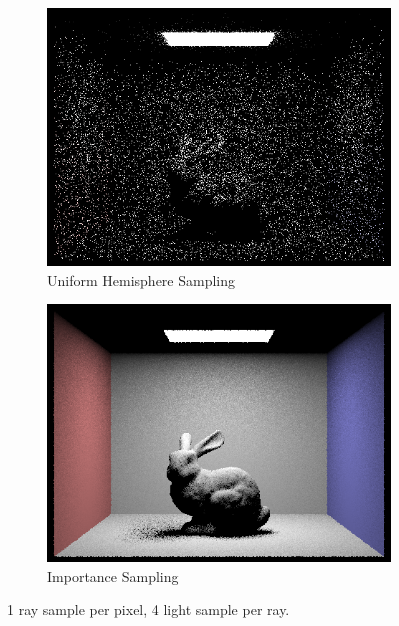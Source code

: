 \documentclass{article}
\begin{document}
\begin{figure}
\begin{subfigure}[h]{0.4\textwidth}
\includegraphics[width=\textwidth]{task3/CBbunny_1_4_h.png}
\caption{Uniform Hemisphere Sampling}
\end{subfigure}
\hfill\vrule\hfill
\begin{subfigure}[h]{0.4\textwidth}
\includegraphics[width=\textwidth]{task3/CBbunny_1_4.png}
\caption{Importance Sampling}
\end{subfigure}%

\caption[f2]{1 ray sample per pixel, 4 light sample per ray.}
\end{figure}
\end{document}
